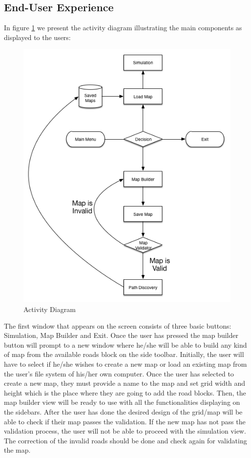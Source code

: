 \documentclass[oneside]{article}
\begin{document}
 \subsection{End-User Experience}
 \noindent 	 In figure \ref{fig:activitydiagram} we present the activity diagram illustrating the main components as displayed to the users:
 
\begin{figure}[h]
\centering
\includegraphics[width=4.5in]{activity_diagram}
\caption{Activity Diagram \label{fig:activitydiagram}}
\end{figure} 
 
\noindent The first window that appears on the screen consists of three basic buttons: Simulation, Map Builder and Exit. Once the user has pressed the map builder button will prompt to a new window where he/she will be able to build any kind of map from the available roads block on the side toolbar. Initially, the user will have to select if he/she wishes to create a new map or load an existing map from the user's file system of his/her own computer. Once the user has selected to create a new map, they must provide a name to the map and set grid width and height which is the place where they are going to add the road blocks. Then, the map builder view will be ready to use with all the functionalities displaying on the sidebars. After the user has done the desired design of the grid/map will be able to check if their map passes the validation. If the new map has not pass the validation process, the user will not be able to proceed with the simulation view. The correction of the invalid roads should be done and check again for validating the map. 
\newline
\end{document}
